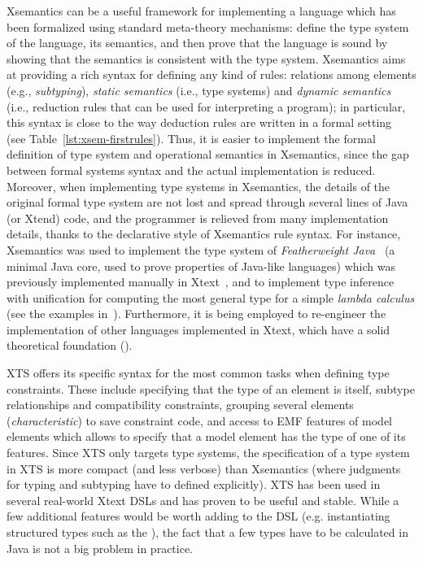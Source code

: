 Xsemantics can be a useful framework for implementing a language which has been
formalized using standard meta-theory mechanisms: define the type system of the
language, its semantics, and then prove that the language is sound by showing
that the semantics is consistent with the type system.
Xsemantics aims at providing a rich syntax for defining any kind of rules:
relations among elements (e.g., \emph{subtyping}), \emph{static semantics}
(i.e., type systems) and \emph{dynamic semantics} (i.e., reduction rules that
can be used for interpreting a program); in particular, this syntax is close to
the way deduction rules are written in a formal
setting~\cite{hindley:1997a,Pierce02} (see Table~\ref{lst:xsem-firstrules}). 
Thus, it is easier to implement the formal definition of type system and operational semantics in Xsemantics, since
the gap between formal systems syntax and the actual implementation is reduced.
Moreover, when implementing type systems in Xsemantics, the details of the
original formal type system are not lost and spread through several lines of
Java (or Xtend) code, and the programmer is relieved from many implementation
details, thanks to the declarative style of Xsemantics rule syntax. For
instance, Xsemantics was used to implement the type system of
\emph{Featherweight Java}~\cite{IgarashiPierceWadler:TOPLAS-2001} (a minimal Java core, used to
prove properties of Java-like languages) which was previously implemented
manually in Xtext~\cite{Bet10}, and to implement type inference with unification
for computing the most general type for a simple \emph{lambda calculus} (see the
examples in~\cite{lbts}).  Furthermore, it is being employed to re-engineer the
implementation of other languages implemented in Xtext, which have a solid
theoretical foundation (\cite{CompDelta,TraitRecordJ-SCP}).

XTS offers its specific syntax for the most common tasks when defining type
constraints. These include specifying that the type of an element is itself,
subtype relationships and compatibility constraints, grouping several elements
(\emph{characteristic}) to save constraint code, and access to EMF features of
model elements which allows to specify that a model element has the type of one
of its features.  Since XTS only targets type systems, the specification of a
type system in XTS is more compact (and less verbose) than Xsemantics (where
judgments for typing and subtyping have to defined explicitly).
XTS has been used in several real-world Xtext DSLs and has
proven to be useful and stable. While a few additional features would be worth
adding to the DSL (e.g. instantiating structured types such as the
), the fact that a few types have to be calculated in Java is not
a big problem in practice.

